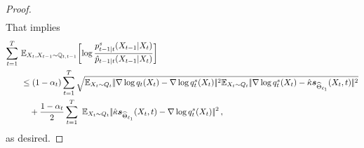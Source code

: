 \begin{proof}
\begin{align*}
    \end{align*}
    That implies 
 \begin{align*}
     \sum_{t=1}^T~&\E_{X_t,X_{t-1}\sim \Fd_{t,t-1}} \biggl[\log\frac{\Bdd^s_{t-1|t}(X_{t-1}|X_t)}{\BddA_{t-1|t}(X_{t-1}|X_t)}\biggr] \\
     &\le (1-\alpha_t)\sum_{t=1}^T\sqrt{\E_{X_t\sim Q_t}\norm{\nabla\log \Fdd_t(X_t)-\nabla\log \Fdds_t(X_t)}^2\E_{X_t\sim Q_t}\norm{\nabla\log \Fdds_t(X_t)-\scaleh\scorefh(X_t,t)}^2}\\
    &~~~+ \frac{1-\alpha_t}{2}\sum_{t=1}^T~\E_{X_t\sim Q_t}\norm{\scaleh\scorefh(X_t,t)-\nabla\log q^s_t(X_t)}^2\,,
 \end{align*} 
 as desired.
\end{proof}



